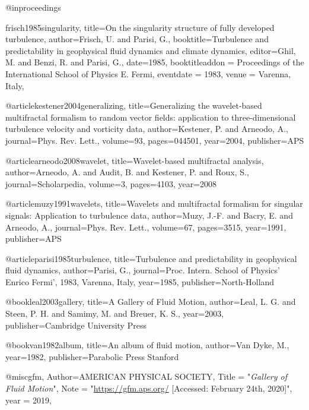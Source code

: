 
  @inproceedings{frisch1985singularity,
    title={{On the singularity structure of fully developed turbulence}},
    author={Frisch, U. and Parisi, G.},
    booktitle={Turbulence and predictability in geophysical fluid dynamics and climate dynamics},
    editor={Ghil, M. and Benzi, R. and Parisi, G.},
    date={1985},
    booktitleaddon = {Proceedings of the International School of Physics E. Fermi},
    eventdate = {1983},
    venue = {Varenna, Italy},

  }

  @article{kestener2004generalizing,
    title={{Generalizing the wavelet-based multifractal formalism to random vector fields: application to three-dimensional turbulence velocity and vorticity data}},
    author={Kestener, P. and Arneodo, A.},
    journal={Phys. Rev. Lett.},
    volume={93},
    pages={044501},
    year={2004},
    publisher={APS}
  }

  @article{arneodo2008wavelet,
    title={{Wavelet-based multifractal analysis}},
    author={Arneodo, A. and Audit, B. and Kestener, P. and Roux, S.},
    journal={Scholarpedia},
    volume={3},
    pages={4103},
    year={2008}
  }

  @article{muzy1991wavelets,
    title={{Wavelets and multifractal formalism for singular signals: Application to turbulence data}},
    author={Muzy, J.-F. and Bacry, E. and Arneodo, A.},
    journal={Phys. Rev. Lett.},
    volume={67},
    pages={3515},
    year={1991},
    publisher={APS}
  }

  @article{parisi1985turbulence,
    title={{Turbulence and predictability in geophysical fluid dynamics}},
    author={Parisi, G.},
    journal={Proc. Intern. School of Physics' Enrico Fermi', 1983, Varenna, Italy},
    year={1985},
    publisher={North-Holland}
  }


  @book{leal2003gallery,
    title={{A Gallery of Fluid Motion}},
    author={Leal, L. G. and Steen, P. H. and Samimy, M. and Breuer, K. S.},
    year={2003},
    publisher={Cambridge University Press}
  }

  @book{van1982album,
    title={{An album of fluid motion}},
    author={Van Dyke, M.},
    year={1982},
    publisher={Parabolic Press Stanford}
  }

  @misc{gfm,
      Author={{AMERICAN PHYSICAL SOCIETY}},
      Title  = "\emph{Gallery of Fluid Motion}",
      Note   = "\url{https://gfm.aps.org/} [Accessed: February 24th, 2020]",
      year = {2019},
  }

